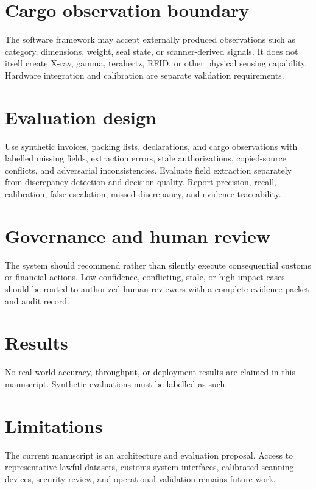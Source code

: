 \documentclass[11pt]{article}
\begin{document}
\section{Cargo observation boundary}
The software framework may accept externally produced observations such as category, dimensions, weight, seal state, or scanner-derived signals. It does not itself create X-ray, gamma, terahertz, RFID, or other physical sensing capability. Hardware integration and calibration are separate validation requirements.
\section{Evaluation design}
Use synthetic invoices, packing lists, declarations, and cargo observations with labelled missing fields, extraction errors, stale authorizations, copied-source conflicts, and adversarial inconsistencies. Evaluate field extraction separately from discrepancy detection and decision quality. Report precision, recall, calibration, false escalation, missed discrepancy, and evidence traceability.
\section{Governance and human review}
The system should recommend rather than silently execute consequential customs or financial actions. Low-confidence, conflicting, stale, or high-impact cases should be routed to authorized human reviewers with a complete evidence packet and audit record.
\section{Results}
No real-world accuracy, throughput, or deployment results are claimed in this manuscript. Synthetic evaluations must be labelled as such.
\section{Limitations}
The current manuscript is an architecture and evaluation proposal. Access to representative lawful datasets, customs-system interfaces, calibrated scanning devices, security review, and operational validation remains future work.
\end{document}
